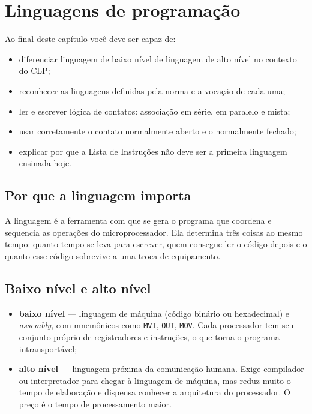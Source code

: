 \chapter{Linguagens de programação}
\label{cap:linguagens}

\begin{objetivos}
Ao final deste capítulo você deve ser capaz de:
\begin{itemize}
  \item diferenciar linguagem de baixo nível de linguagem de alto nível no contexto do CLP;
  \item reconhecer as linguagens definidas pela norma e a vocação de cada uma;
  \item ler e escrever lógica de contatos: associação em série, em paralelo e mista;
  \item usar corretamente o contato normalmente aberto e o normalmente fechado;
  \item explicar por que a Lista de Instruções não deve ser a primeira linguagem ensinada hoje.
\end{itemize}
\end{objetivos}

\section{Por que a linguagem importa}

A linguagem é a ferramenta com que se gera o programa que coordena e sequencia as operações do
microprocessador. Ela determina três coisas ao mesmo tempo: quanto tempo se leva para escrever,
quem consegue ler o código depois e o quanto esse código sobrevive a uma troca de equipamento.


\section{Baixo nível e alto nível}

\begin{itemize}
  \item \textbf{baixo nível} --- linguagem de máquina (código binário ou hexadecimal) e
        \emph{assembly}, com mnemônicos como \texttt{MVI}, \texttt{OUT}, \texttt{MOV}. Cada
        processador tem seu conjunto próprio de registradores e instruções, o que torna o programa
        intransportável;
  \item \textbf{alto nível} --- linguagem próxima da comunicação humana. Exige compilador ou
        interpretador para chegar à linguagem de máquina, mas reduz muito o tempo de elaboração e
        dispensa conhecer a arquitetura do processador. O preço é o tempo de processamento maior.
\end{itemize}

